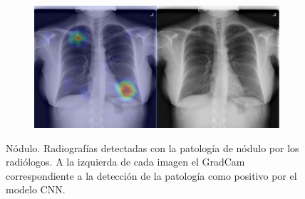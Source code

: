 \begin{figure}[b]
\begin{subfigure}{0.4\textwidth}
    \end{subfigure}
    \begin{subfigure}{0.4\textwidth}
        \centering
        \includegraphics[width=1.0\textwidth]{Chapters/5. Conclusiones/img/Nodule/1_1_00026319_000.png}
    \end{subfigure}

    \caption[short]{Nódulo. Radiografías detectadas con la patología de nódulo por los
                    radiólogos. A la izquierda de cada imagen el GradCam correspondiente a la detección
                    de la patología como positivo por el modelo CNN.}
\end{figure}

